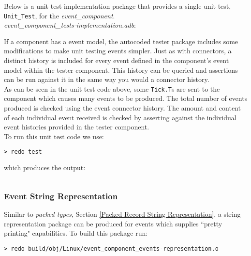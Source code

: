 Below is a unit test implementation package that provides a single unit test, \texttt{Unit\_Test}, for the \textit{event\_component}. \\

\textit{event\_component\_tests-implementation.adb}:

If a component has a event model, the autocoded tester package includes some modifications to make unit testing events simpler. Just as with connectors, a distinct history is included for every event defined in the component's event model within the tester component. This history can be queried and assertions can be run against it in the same way you would a connector history. \\

As can be seen in the unit test code above, some \texttt{Tick.T}s are sent to the component which causes many events to be produced. The total number of events produced is checked using the event connector history. The amount and content of each individual event received is checked by asserting against the individual event histories provided in the tester component. \\

To run this unit test code we use:

\vspace{5mm} %
\begin{verbatim}
> redo test
\end{verbatim}
\vspace{5mm} %

which produces the output:

\vspace{5mm} %
\inputminted{text}{../example_architecture/event_component/test/output.txt}
\vspace{5mm} %

\subsubsection{Event String Representation} \label{Event String Representation}

Similar to \textit{packed types}, Section \ref{Packed Record String Representation}, a string representation package can be produced for events which supplies ``pretty printing" capabilities. To build this package run:

\vspace{5mm} %
\begin{verbatim}
> redo build/obj/Linux/event_component_events-representation.o
\end{verbatim}
\vspace{5mm} %

